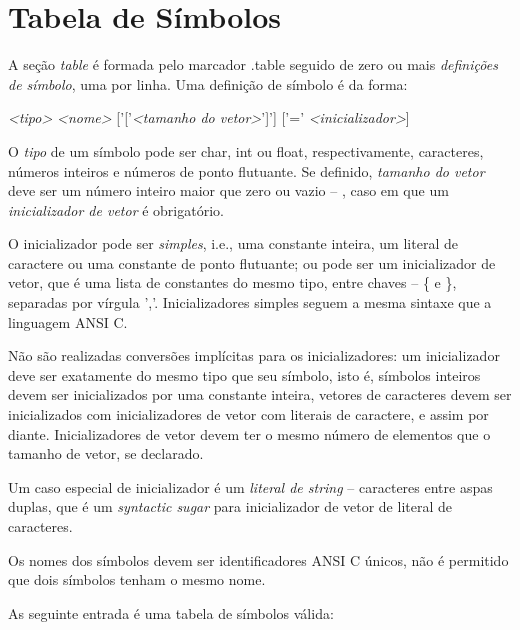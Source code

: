 \documentclass[12pt,a4paper,extrafontsizes,article]{memoir}
\newcommand*{\srcfont}{\fontfamily{pcr}\selectfont}
\begin{document}
\section{Tabela de Símbolos}

A seção \textit{table} é formada pelo marcador {\srcfont .table} seguido de zero ou mais \textit{definições de
símbolo}, uma por linha. Uma definição de símbolo é da forma:

\bigskip
{\srcfont\scriptsize \textit{<tipo>} \textit{<nome>} ['['\textit{<tamanho do vetor>}']'] ['='
\textit{<inicializador>}]\color{red}{\char`\\n}}
\bigskip

O \textit{tipo} de um símbolo pode ser {\srcfont char}, {\srcfont int} ou {\srcfont float}, respectivamente, caracteres,
números inteiros e números de ponto flutuante. Se definido, \textit{tamanho do vetor} deve ser um número inteiro maior que zero
ou vazio -- {\srcfont []}, caso em que um \textit{inicializador de vetor} é obrigatório.

O inicializador pode ser \textit{simples}, i.e., uma constante inteira, um literal de caractere ou uma constante de
ponto flutuante; ou pode ser um inicializador de vetor, que é uma lista de constantes do mesmo tipo, entre chaves --
{\srcfont \{} e {\srcfont \}}, separadas por vírgula {\srcfont ','}. Inicializadores simples
seguem a mesma sintaxe que a linguagem ANSI C.

Não são realizadas conversões implícitas para os inicializadores: um inicializador deve ser exatamente do mesmo tipo que
seu símbolo, isto é, símbolos inteiros devem ser inicializados por uma constante inteira, vetores de caracteres devem
ser inicializados com inicializadores de vetor com literais de caractere, e assim por diante. Inicializadores de vetor
devem ter o mesmo número de elementos que o tamanho de vetor, se declarado.

Um caso especial de inicializador é um \textit{literal de string} -- caracteres entre aspas duplas, que é um
\textit{syntactic sugar} para inicializador de vetor de literal de caracteres.

Os nomes dos símbolos devem ser identificadores ANSI C únicos, não é permitido que dois símbolos tenham o mesmo nome.

As seguinte entrada é uma tabela de símbolos válida:\\
\end{document}
